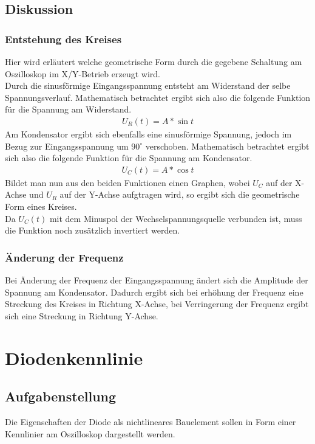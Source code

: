 \documentclass[12pt,a4paper,titlepage]{article}
\begin{document}
\subsection{Diskussion}
\subsubsection{Entstehung des Kreises}
Hier wird erl\"autert welche geometrische Form durch die gegebene Schaltung am Oszilloskop im X/Y-Betrieb erzeugt wird.\\
Durch die sinusf\"ormige Eingangsspannung entsteht am Widerstand der selbe Spannungsverlauf. Mathematisch betrachtet ergibt sich also die folgende Funktion f\"ur die Spannung am Widerstand.
\begin{align*}
  U_R(t) = A*\sin{t}
\end{align*}
Am Kondensator ergibt sich ebenfalls eine sinusf\"ormige Spannung, jedoch im Bezug zur Eingangsspannung um $90^{\circ}$ verschoben. Mathematisch betrachtet ergibt sich also die folgende Funktion f\"ur die Spannung am Kondensator.
\begin{align*}
  U_C(t) = A*\cos{t}
\end{align*}
Bildet man nun aus den beiden Funktionen einen Graphen, wobei $U_C$ auf der X-Achse und $U_R$ auf der Y-Achse aufgtragen wird, so ergibt sich die geometrische Form eines Kreises.\\
Da $U_C(t)$ mit dem Minuspol der Wechselspannungsquelle verbunden ist, muss die Funktion noch zus\"atzlich invertiert werden.

\subsubsection{\"Anderung der Frequenz}
Bei \"Anderung der Frequenz der Eingangsspannung \"andert sich die Amplitude der Spannung am Kondensator. Dadurch ergibt sich bei erh\"ohung der Frequenz eine Streckung des Kreises in Richtung X-Achse, bei Verringerung der Frequenz ergibt sich eine Streckung in Richtung Y-Achse.


\section{Diodenkennlinie}

\subsection{Aufgabenstellung}
Die Eigenschaften der Diode als nichtlineares Bauelement sollen in Form einer Kennlinier am Oszilloskop dargestellt werden.
\end{document}
